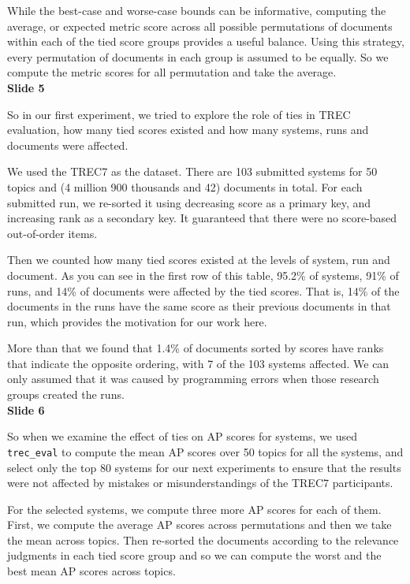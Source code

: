 \documentclass{article}
\begin{document}
While the best-case and worse-case bounds can be informative, computing the average, or expected metric score across all possible permutations of documents within each of the tied score groups provides a useful balance. Using this strategy, every permutation of documents in each group is assumed to be equally. So we compute the metric scores for all permutation and take the average.\\[1em]

\textbf{Slide 5}

So in our first experiment, we tried to explore the role of ties in TREC evaluation, how many tied scores existed and how many systems, runs and documents were affected. 

We used the TREC7 as the dataset. There are 103 submitted systems for 50 topics and (4 million 900 thousands and 42) documents in total. For each submitted run, we re-sorted it using decreasing score as a primary key, and increasing rank as a secondary key. It guaranteed that there were no score-based out-of-order items. 

Then we counted how many tied scores existed at the levels of system, run and document. As you can see in the first row of this table, 95.2\% of systems, 91\% of runs, and 14\% of documents were affected by the tied scores. That is, 14\% of the documents in the runs have the same score as their previous documents in that run, which provides the motivation for our work here.

More than that we found that 1.4\% of documents sorted by scores have ranks that indicate the opposite ordering, with 7 of the 103 systems affected. We can only assumed that it was caused by programming errors when those research groups created the runs.\\[1em]

\textbf{Slide 6}

So when we examine the effect of ties on AP scores for systems, we used \texttt{trec\_eval} to compute the mean AP scores over 50 topics for all the systems, and select only the top 80 systems for our next experiments to ensure that the results were not affected by mistakes or misunderstandings of the TREC7 participants.

For the selected systems, we compute three more AP scores for each of them. First, we compute the average AP scores across permutations and then we take the mean across topics. Then re-sorted the documents according to the relevance judgments in each tied score group and so we can compute the worst and the best mean AP scores across topics.\\[1em]
\end{document}
